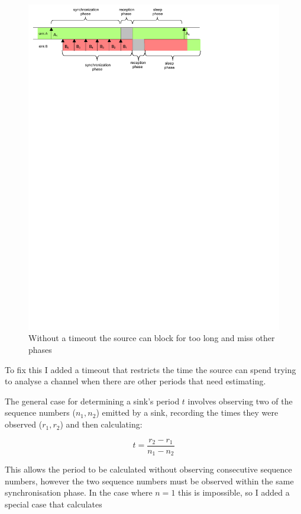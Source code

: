 \documentclass{article}
\begin{document}
\begin{figure}[h]
\includegraphics[trim=1cm 22cm 1cm 1cm]{embs-blocking}
\caption{Without a timeout the source can block for too long and miss other phases}
\label{fig:long-blocking}
\end{figure}

To fix this I added a timeout that restricts the time the source can spend trying to analyse a
channel when there are other periods that need estimating.

The general case for determining a sink's period $t$ involves observing two of the sequence numbers ($n_1, n_2$) emitted by a sink,
recording the times they were observed ($r_1, r_2$) and then calculating:

$$t = \frac{r_2 - r_1} {n_1 - n_2}$$

This allows the period to be calculated without observing consecutive sequence numbers, however the two
sequence numbers must be observed within the same synchronisation phase. In the case where $n=1$ this is impossible,
so I added a special case that calculates
\end{document}
